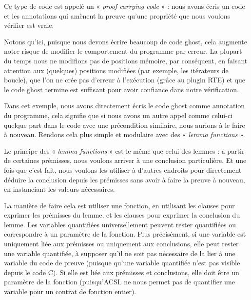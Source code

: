 



Ce type de code est appelé un « \textit{proof carrying code} » : nous avons écris un code
et les annotations qui amènent la preuve qu'une propriété que nous voulons vérifier
est vraie.


Notons qu'ici, puisque nous devons écrire beaucoup de code ghost, cela augmente
notre risque de modifier le comportement du programme par erreur. La plupart du
temps nous ne modifions pas de positions mémoire, par conséquent, en faisant
attention aux (quelques) positions modifiées (par exemple, les itérateurs de
boucle), que l'on ne crée pas d'erreur à l'exécution (grâce au plugin RTE) et
que le code ghost termine est suffisant pour avoir confiance dans notre
vérification.


Dans cet exemple, nous avons directement écris le code ghost comme annotation du
programme, cela signifie que si nous avons un autre appel comme celui-ci quelque
part dans le code avec une précondition similaire, nous aurions à le faire à
nouveau. Rendons cela plus simple et modulaire avec des « \textit{lemma functions} ».





Le principe des « \textit{lemma functions} » est le même que celui des lemmes : à
partir de certaines prémisses, nous voulons arriver à une conclusion particulière.
Et une fois que c'est fait, nous voulons les utiliser à d'autres endroits pour 
directement déduire la conclusion depuis les prémisses sans avoir à faire la
preuve à nouveau, en instanciant les valeurs nécessaires.


La manière de faire cela est utiliser une fonction, en utilisant les clauses
 pour exprimer les prémisses du lemme, et les clauses
 pour exprimer la conclusion du lemme. Les variables
quantifiées universellement peuvent rester quantifiées ou correspondre à un
paramètre de la fonction. Plus précisément, si une variable est uniquement liée
aux prémisses ou uniquement aux conclusions, elle peut rester une variable
quantifiée, à supposer qu'il ne soit pas nécessaire de la lier à une variable
du code de preuve (puisque qu'une variable quantifiée n'est pas visible depuis
le code C). Si elle est liée aux prémisses et conclusions, elle doit être un
paramètre de la fonction (puisqu'ACSL ne nous permet pas de quantifier une
variable pour un contrat de fonction entier).


